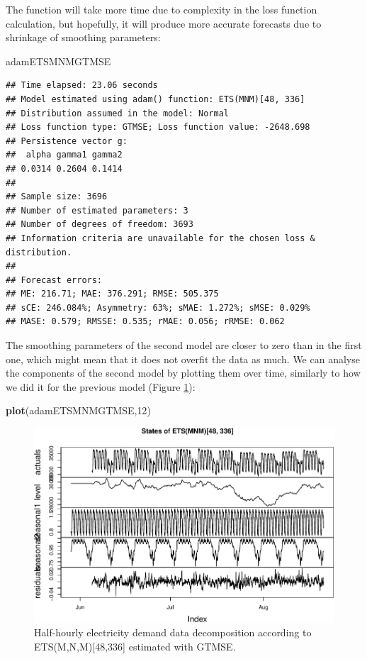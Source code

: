 \documentclass[]{book}
\newenvironment{Shaded}{\begin{snugshade}}{\end{snugshade}}
\newcommand{\DecValTok}[1]{\textcolor[rgb]{0.00,0.00,0.81}{#1}}
\newcommand{\KeywordTok}[1]{\textcolor[rgb]{0.13,0.29,0.53}{\textbf{#1}}}
\newcommand{\NormalTok}[1]{#1}
\theoremstyle{definition}
\theoremstyle{definition}
\theoremstyle{definition}
\theoremstyle{definition}
\theoremstyle{remark}
\begin{document}
The function will take more time due to complexity in the loss function calculation, but hopefully, it will produce more accurate forecasts due to shrinkage of smoothing parameters:

\begin{Shaded}
\begin{Highlighting}[]
\NormalTok{adamETSMNMGTMSE}
\end{Highlighting}
\end{Shaded}

\begin{verbatim}
## Time elapsed: 23.06 seconds
## Model estimated using adam() function: ETS(MNM)[48, 336]
## Distribution assumed in the model: Normal
## Loss function type: GTMSE; Loss function value: -2648.698
## Persistence vector g:
##  alpha gamma1 gamma2 
## 0.0314 0.2604 0.1414 
## 
## Sample size: 3696
## Number of estimated parameters: 3
## Number of degrees of freedom: 3693
## Information criteria are unavailable for the chosen loss & distribution.
## 
## Forecast errors:
## ME: 216.71; MAE: 376.291; RMSE: 505.375
## sCE: 246.084%; Asymmetry: 63%; sMAE: 1.272%; sMSE: 0.029%
## MASE: 0.579; RMSSE: 0.535; rMAE: 0.056; rRMSE: 0.062
\end{verbatim}

The smoothing parameters of the second model are closer to zero than in the first one, which might mean that it does not overfit the data as much. We can analyse the components of the second model by plotting them over time, similarly to how we did it for the previous model (Figure \ref{fig:adamModelETSMNMGTMSE12}):

\begin{Shaded}
\begin{Highlighting}[]
\KeywordTok{plot}\NormalTok{(adamETSMNMGTMSE,}\DecValTok{12}\NormalTok{)}
\end{Highlighting}
\end{Shaded}

\begin{figure}
\centering
\includegraphics{Svetunkov--2022----ADAM_files/figure-latex/adamModelETSMNMGTMSE12-1.pdf}
\caption{\label{fig:adamModelETSMNMGTMSE12}Half-hourly electricity demand data decomposition according to ETS(M,N,M){[}48,336{]} estimated with GTMSE.}
\end{figure}
\end{document}
